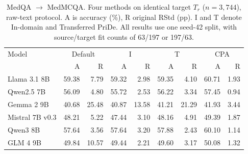 \begin{table}[htbp]
\centering\small\setlength{\tabcolsep}{4pt}
\caption{MedQA $\rightarrow$ MedMCQA. Four methods on identical target $T_r$ ($n=3,744$), raw-text protocol. A is accuracy (\%), R original RStd (pp). I and T denote In-domain and Transferred PriDe. All results use one seed-42 split, with source/target fit counts of 63/197 or 197/63.}
\label{tab:transfer-medqa}
\begin{tabular}{lrrrrrrrr}
\toprule
Model & \multicolumn{2}{c}{Default} & \multicolumn{2}{c}{I} & \multicolumn{2}{c}{T} & \multicolumn{2}{c}{CPA}\\
 & A & R & A & R & A & R & A & R\\
\midrule
Llama 3.1 8B & 59.38 & 7.79 & 59.32 & 2.98 & 59.35 & 4.10 & 60.71 & 1.93\\
Qwen2.5 7B & 56.09 & 4.80 & 55.72 & 2.53 & 56.22 & 3.34 & 57.45 & 0.94\\
Gemma 2 9B & 40.68 & 25.48 & 40.87 & 13.58 & 41.21 & 21.29 & 41.93 & 3.44\\
Mistral 7B v0.3 & 48.21 & 5.22 & 47.44 & 3.10 & 48.16 & 4.91 & 49.39 & 1.87\\
Qwen3 8B & 57.64 & 3.56 & 57.64 & 3.20 & 57.88 & 2.43 & 60.10 & 1.14\\
GLM 4 9B & 49.84 & 10.57 & 49.44 & 2.21 & 49.60 & 3.17 & 50.08 & 1.32\\
\bottomrule
\end{tabular}
\end{table}
